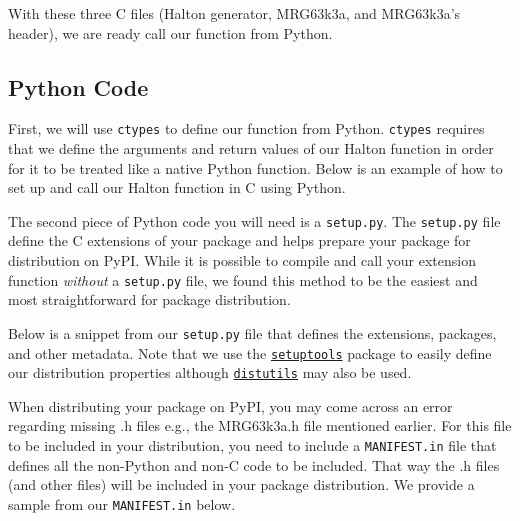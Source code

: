 With these three C files (Halton generator, MRG63k3a, and MRG63k3a's header), we are ready call our function from Python.

\subsection{Python Code}

First, we will use \texttt{ctypes} to define our function from Python. \texttt{ctypes} requires that we define the arguments and return values of our Halton function in order for it to be treated like a native Python function. Below is an example of how to set up and call our Halton function in C using Python.



The second piece of Python code you will need is a \texttt{setup.py}. The \texttt{setup.py} file define the C extensions of your package and helps prepare your package for distribution on PyPI. While it is possible to compile and call your extension function \emph{without} a \texttt{setup.py} file, we found this method to be the easiest and most straightforward for package distribution.

Below is a snippet from our \texttt{setup.py} file that defines the extensions, packages, and other metadata. Note that we use the \href{https://setuptools.readthedocs.io/en/latest/}{\texttt{setuptools}} package to easily define our distribution properties although  \href{https://docs.python.org/3/library/distutils.html}{\texttt{distutils}} may also be used. 



When distributing your package on PyPI, you may come across an error regarding missing .h files e.g., the MRG63k3a.h file mentioned earlier. For this file to be included in your distribution, you need to include a \texttt{MANIFEST.in} file that defines all the non-Python and non-C code to be included. That way the .h files (and other files) will be included in your package distribution. We provide a sample from our \texttt{MANIFEST.in} below. 


